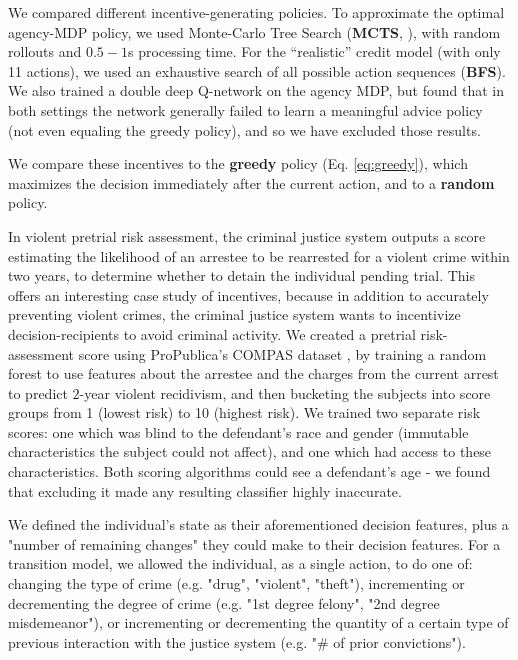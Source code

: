 
We compared different incentive-generating policies. To approximate the optimal agency-MDP policy, we used Monte-Carlo Tree Search (\textbf{MCTS}, \cite{browne2012survey}), with random rollouts and $0.5-1$s processing time. For the ``realistic'' credit model (with only 11 actions), we used an exhaustive search of all possible action sequences (\textbf{BFS}).
We also trained a double deep Q-network \cite{van2016deep} on the agency MDP, but found that in both settings the network generally failed to learn a meaningful advice policy (not even equaling the greedy policy), and so we have excluded those results.

We compare these incentives to the \textbf{greedy} policy (Eq. \ref{eq:greedy}), which maximizes the decision immediately after the current action, and to a \textbf{random} policy.



In violent pretrial risk assessment, the criminal justice system outputs a score estimating the likelihood of an arrestee to be rearrested for a violent crime within two years, to determine whether to detain the individual pending trial. This offers an interesting case study of incentives, because in addition to accurately preventing violent crimes, the criminal justice system wants to incentivize decision-recipients to avoid criminal activity. We created a pretrial risk-assessment score using ProPublica's COMPAS dataset \cite{angwin_larson_kirchner_mattu_2019}, by training a random forest to use features about the arrestee and the charges from the current arrest to predict $2$-year violent recidivism, and then bucketing the subjects into score groups from 1 (lowest risk) to 10 (highest risk).
We trained two separate risk scores: one which was blind to the defendant's race and gender (immutable characteristics the subject could not affect), and one which had access to these characteristics. Both scoring algorithms could see a defendant's age - we found that excluding it made any resulting classifier highly inaccurate.

We defined the individual's state as their aforementioned decision features, plus a "number of remaining changes" they could make to their decision features. For a transition model, we allowed the individual, as a single action, to do one of: changing the type of crime (e.g. "drug", "violent", "theft"), incrementing or decrementing the degree of crime (e.g. "1st degree felony", "2nd degree misdemeanor"), or incrementing or decrementing the quantity of a certain type of previous interaction with the justice system (e.g. "\# of prior convictions").

